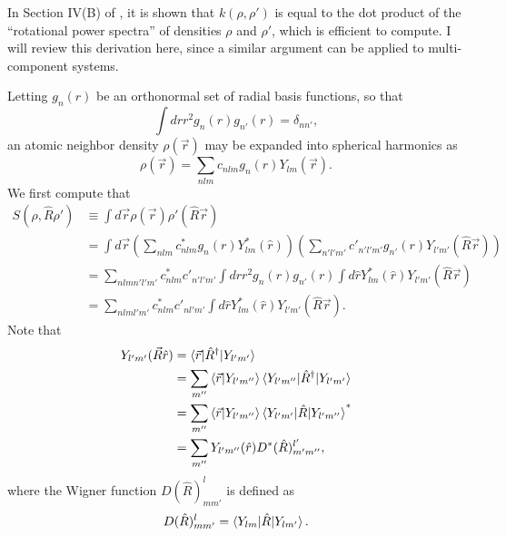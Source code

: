 \documentclass[%
preprint,
amsmath,amssymb,
aps,
]{revtex4-1}
\begin{document}
In Section IV(B) of \cite{bartok2013representing}, it is shown that $k(\rho, \rho')$ is equal to the dot product of the ``rotational power spectra'' of densities $\rho$ and $\rho'$, which is efficient to compute. I will review this derivation here, since a similar argument can be applied to multi-component systems.

Letting $g_n(r)$ be an orthonormal set of radial basis functions, so that
\begin{equation}
\int dr r^2 g_n(r) g_{n'}(r) = \delta_{n n'},
\end{equation}
an atomic neighbor density $\rho(\vec{r})$ may be expanded into spherical harmonics as
\begin{equation}
\rho(\vec{r}) = \sum_{n l m} c_{n l m} g_n(r) Y_{l m} (\vec{r}).
\end{equation}
We first compute that
\begin{equation} \label{S_eq}
\begin{split}
   S(\rho, \hat{R} \rho') &\equiv \int d\vec{r} \rho(\vec{r}) \rho'(\hat{R} \vec{r}) \\
   &= \int d\vec{r} \left(\sum_{n l m} c_{n l m}^* g_n(r)Y_{l m}^*(\hat{r}) \right)\left(\sum_{n' l' m'} c'_{n' l' m'} g_{n'}(r)Y_{l' m'}(\hat{R} \vec{r}) \right) \\
   &= \sum_{n l m n' l' m'} c^*_{n l m} c'_{n' l' m'} \int dr r^2 g_n(r) g_{n'}(r) \int d\hat{r} Y^*_{l m}(\hat{r}) Y_{l' m'}(\hat{R} \vec{r}) \\
   &= \sum_{n l m l' m'} c^*_{n l m} c'_{n l' m'} \int d\hat{r} Y^*_{l m}(\hat{r}) Y_{l' m'} (\hat{R} \vec{r}).
\end{split}
\end{equation}
Note that
\begin{equation}
    \begin{split}
Y_{l' m'}(\vec{R} \hat{r}) &= \braket{\vec{r} | \hat{R}^\dagger | Y_{l' m'}} \\
&= \sum_{m''} \braket{\vec{r} | Y_{l' m''}} \braket{Y_{l' m''} | \hat{R}^\dagger | Y_{l' m'}} \\
&= \sum_{m''} \braket{\vec{r} | Y_{l' m''}} \braket{Y_{l' m'} | \hat{R} | Y_{l' m''}}^* \\
&= \sum_{m''} Y_{l' m''}(\hat{r}) D^*(\hat{R})_{m' m''}^{l'},
    \end{split}
\end{equation}
where the Wigner function $D(\hat{R})_{m m'}^{l}$ is defined as
\begin{equation}
D(\hat{R})_{m m'}^{l} = \braket{Y_{l m} | \hat{R} | Y_{l m'}}.
\end{equation}
\end{document}
